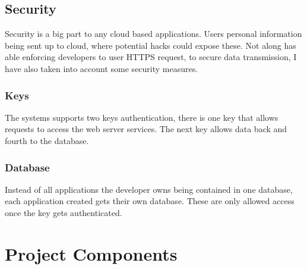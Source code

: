 \subsection{Security}
Security is a big part to any cloud based applications. Users personal information being sent up to cloud, where potential hacks could expose these. Not along has able enforcing developers to user HTTPS request, to secure data transmission, I have also taken into account some security measures. 

\subsubsection{Keys}
The systems supports two keys authentication, there is one key that allows requests to access the web server services. The next key allows data back and fourth to the database.

\subsubsection{Database}
Instead of all applications the developer owns being contained in one database, each application created gets their own database. These are only allowed access once the key gets authenticated.


\section{Project Components}



